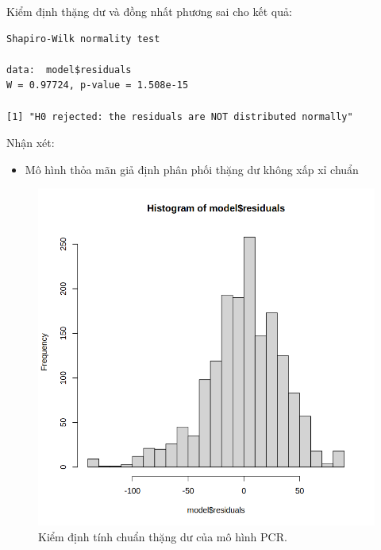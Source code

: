 Kiểm định thặng dư và đồng nhất phương sai cho kết quả:
\begin{lstlisting}
Shapiro-Wilk normality test

data:  model$residuals
W = 0.97724, p-value = 1.508e-15

[1] "H0 rejected: the residuals are NOT distributed normally"
\end{lstlisting}
Nhận xét:
\begin{itemize}
    \item Mô hình thỏa mãn giả định phân phối thặng dư không xấp xỉ chuẩn
\end{itemize}
\begin{figure}[H]
    \centering
    \includegraphics[width=0.75\columnwidth]{csm_figures/pls_normality_test.png}
    \caption{Kiểm định tính chuẩn thặng dư của mô hình PCR.}
    \label{fig:pls_normality_test}
\end{figure}

